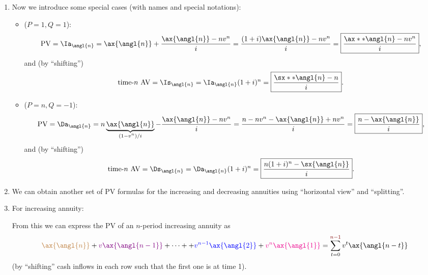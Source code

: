 \begin{enumerate}
\item \label{it:pv-av-incr-decr-annuities}
Now we introduce some special cases (with names and special notations):
\begin{itemize}
\item {} (\(P=1, Q=1\)):
\[
\text{PV}=\Ia_{\angl{n}}=
\ax{\angl{n}}+\frac{\ax{\angl{n}}-nv^n}{i}
=\frac{(1+i)\ax{\angl{n}}-nv^n}{i}
=\boxed{\frac{\ax**{\angl{n}}-nv^n}{i}},
\]
and (by ``shifting'')
\[
\text{time-\(n\) AV}=\Is_{\angl{n}}=\Ia_{\angl{n}}(1+i)^n=\boxed{\frac{\sx**{\angl{n}}-n}{i}}.
\]
\item {} (\(P=n, Q=-1\)):
\[
\text{PV}=\Da_{\angl{n}}=
n\underbrace{\ax{\angl{n}}}_{\mathclap{(1-v^n)/i}}-\frac{\ax{\angl{n}}-nv^n}{i}
=\frac{n-nv^n-\ax{\angl{n}}+nv^n}{i}
=\boxed{\frac{n-\ax{\angl{n}}}{i}},
\]
and (by ``shifting'')
\[
\text{time-\(n\) AV}=\Ds_{\angl{n}}=\Da_{\angl{n}}(1+i)^n=\boxed{\frac{n(1+i)^n-\sx{\angl{n}}}{i}}.
\]
\end{itemize}

\item We can obtain another set of PV formulas for the increasing and
decreasing annuities using ``horizontal view'' and ``splitting''.

\item \label{it:pv-incr-annuity-alt}
For increasing annuity:
\begin{center}
\end{center}
From this we can express the PV of an \(n\)-period increasing annuity as
\[
{\color{brown}\ax{\angl{n}}}
+{\color{violet}v\ax{\angl{n-1}}}
+\dotsb+
+{\color{blue}v^{n-1}\ax{\angl{2}}}
+{\color{magenta}v^{n}\ax{\angl{1}}}
=\sum_{t=0}^{{\color{Maroon}n-1}}v^t\ax{\angl{n-t}}
\]
(by ``shifting'' cash inflows in each row such that the first one is at time 1).


\end{enumerate}
